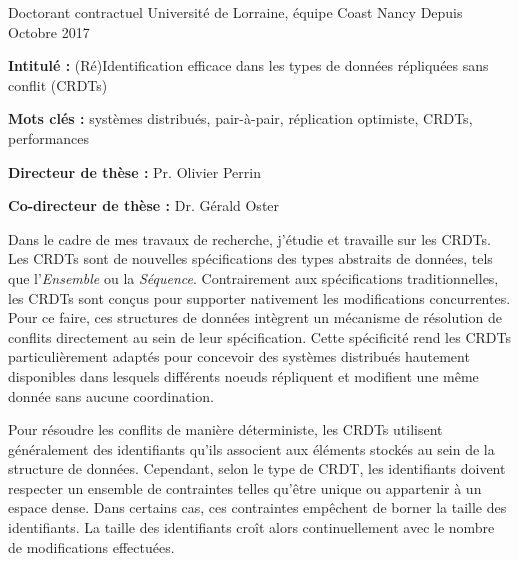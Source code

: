 \documentclass[12pt, a4paper]{awesome-cv}
\begin{document}
\makecvheader[C]



\begin{cventries}

\cventry
  {Doctorant contractuel}
  {Université de Lorraine, équipe Coast}
  {Nancy}
  {Depuis Octobre 2017}
  {
    \begin{cvitems} %
      \item {\textbf{Intitulé :} (Ré)Identification efficace dans les types de données répliquées sans conflit (CRDTs)}
      \item{\textbf{Mots clés :} systèmes distribués, pair-à-pair, réplication optimiste, CRDTs, performances}
      \item{\textbf{Directeur de thèse :} Pr. Olivier Perrin}
      \item{\textbf{Co-directeur de thèse :} Dr. Gérald Oster}
    \end{cvitems}
  }

\begin{cvparagraph}
  Dans le cadre de mes travaux de recherche, j'étudie et travaille sur les \acfp{CRDT}.
  Les \acp{CRDT} sont de nouvelles spécifications des types abstraits de données, tels que l'\emph{Ensemble} ou la \emph{Séquence}.
  Contrairement aux spécifications traditionnelles, les \acp{CRDT} sont conçus pour supporter nativement les modifications concurrentes.
  Pour ce faire, ces structures de données intègrent un mécanisme de résolution de conflits directement au sein de leur spécification.
  Cette spécificité rend les \acp{CRDT} particulièrement adaptés pour concevoir des systèmes distribués hautement disponibles dans lesquels différents noeuds répliquent et modifient une même donnée sans aucune coordination.

  Pour résoudre les conflits de manière déterministe, les \acp{CRDT} utilisent généralement des identifiants qu'ils associent aux éléments stockés au sein de la structure de données.
  Cependant, selon le type de \ac{CRDT}, les identifiants doivent respecter un ensemble de contraintes telles qu'être unique ou appartenir à un espace dense.
  Dans certains cas, ces contraintes empêchent de borner la taille des identifiants.
  La taille des identifiants croît alors continuellement avec le nombre de modifications effectuées.


\end{cvparagraph}
\end{cventries}
\end{document}
